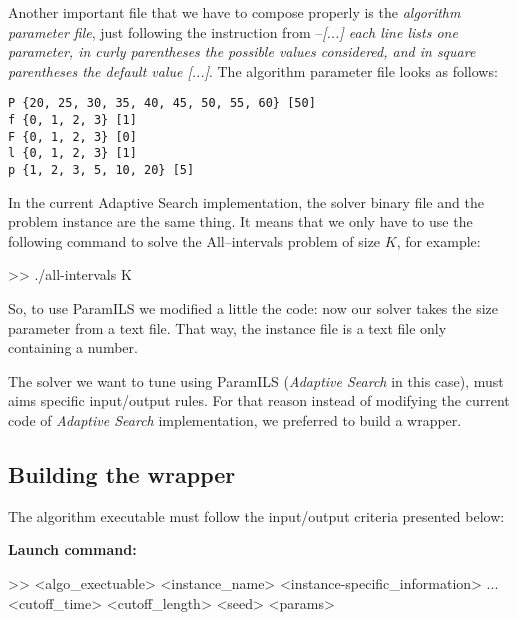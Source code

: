 Another important file that we have to compose properly is the {\it algorithm parameter file}, just following the instruction from \cite{Hutter2008} --\textit{[...] each line lists one parameter, in curly parentheses the possible values considered, and in square parentheses the default value [...]}. The algorithm parameter file looks as follows:\\

\begin{shadedbox}
	\texttt{P \{20, 25, 30, 35, 40, 45, 50, 55, 60\} [50]\\
		f \{0, 1, 2, 3\} [1]\\
		F \{0, 1, 2, 3\} [0]\\
		l \{0, 1, 2, 3\} [1]\\
		p \{1, 2, 3, 5, 10, 20\} [5]
	}
\end{shadedbox}

In the current Adaptive Search implementation, the solver binary file and the problem instance are the same thing. It means that we only have to use the following command to solve the All--intervals problem of size $K$, for example: 

\begin{BGVerbatim}
>> ./all-intervals K
\end{BGVerbatim}

So, to use {\sc ParamILS} we modified a little the code: now our solver takes the size parameter from a text file. That way, the instance file is a text file only containing a number.

The solver we want to tune using {\sc ParamILS} ({\it Adaptive Search} in this case), must aims specific input/output rules. For that reason instead of modifying the current code of {\it Adaptive Search} implementation, we preferred to build a wrapper.

\subsection{Building the wrapper}

The algorithm executable must follow the input/output criteria presented below: 

\textbf{\large Launch command:} 

\begin{BGVerbatim}
>> <algo_exectuable> <instance_name> <instance-specific_information> ...
<cutoff_time> <cutoff_length> <seed> <params>
\end{BGVerbatim}

